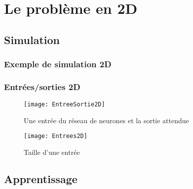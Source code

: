 

% 

\section{Le problème en 2D}

\subsection{Simulation}

\begin{frame}[fragile]
    \frametitle{Exemple de simulation 2D}
  \begin{center}
  \end{center}
\end{frame}

\begin{frame}[fragile]
    \frametitle{Entrées/sorties 2D}

        \begin{figure}
        \texttt{[image: EntreeSortie2D]}       
        \caption{Une entrée du réseau de neurones et la sortie attendue}
        \end{figure}
        \begin{figure}
        \texttt{[image: Entrees2D]}       
        \caption{Taille d'une entrée}
        \end{figure}

\end{frame}

\subsection{Apprentissage}

